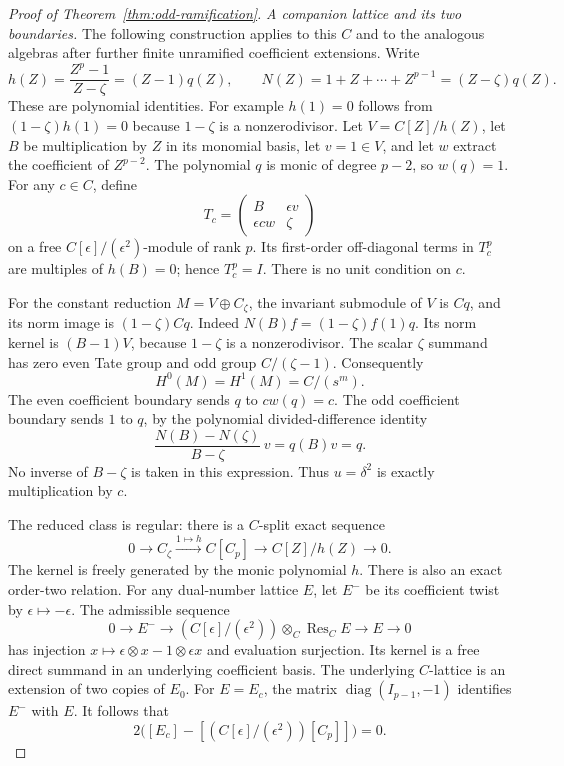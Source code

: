 \begin{proof}[Proof of Theorem~\ref{thm:odd-ramification}]
\emph{A companion lattice and its two boundaries.}
The following construction applies to this $C$ and to the analogous
algebras after further finite unramified coefficient extensions.
Write
\[
 h(Z)=\frac{Z^p-1}{Z-\zeta}=(Z-1)q(Z),\qquad
 N(Z)=1+Z+\cdots+Z^{p-1}=(Z-\zeta)q(Z).
\]
These are polynomial identities.  For example $h(1)=0$ follows from
$(1-\zeta)h(1)=0$ because $1-\zeta$ is a nonzerodivisor.
Let $V=C[Z]/h(Z)$, let $B$ be multiplication by $Z$ in its monomial
basis, let $v=1\in V$, and let $w$ extract the coefficient of
$Z^{p-2}$.  The polynomial $q$ is monic of degree $p-2$, so $w(q)=1$.
For any $c\in C$, define
\[
 T_c=\begin{pmatrix}B&\epsilon v\\\epsilon c w&\zeta\end{pmatrix}
\]
on a free $C[\epsilon]/(\epsilon^2)$-module of rank $p$.
Its first-order off-diagonal terms in $T_c^p$ are multiples of
$h(B)=0$; hence $T_c^p=I$.
There is no unit condition on $c$.

For the constant reduction $M=V\oplus C_\zeta$, the invariant
submodule of $V$ is $Cq$, and its norm image is $(1-\zeta)Cq$.
Indeed $N(B)f=(1-\zeta)f(1)q$.
Its norm kernel is $(B-1)V$, because $1-\zeta$ is a nonzerodivisor.
The scalar $\zeta$ summand has zero even Tate group and odd group
$C/(\zeta-1)$.  Consequently
\[
 H^0(M)=H^1(M)=C/(s^m).
\]
The even coefficient boundary sends $q$ to $cw(q)=c$.
The odd coefficient boundary sends $1$ to $q$, by the polynomial
divided-difference identity
\[
 \frac{N(B)-N(\zeta)}{B-\zeta}\,v=q(B)v=q.
\]
No inverse of $B-\zeta$ is taken in this expression.
Thus $u=\delta^2$ is exactly multiplication by $c$.

The reduced class is regular: there is a $C$-split exact sequence
\[
 0\longrightarrow C_\zeta\xrightarrow{1\mapsto h}
 C[C_p]\longrightarrow C[Z]/h(Z)\longrightarrow0.
\]
The kernel is freely generated by the monic polynomial $h$.
There is also an exact order-two relation.
For any dual-number lattice $E$, let $E^-$ be its coefficient twist
by $\epsilon\mapsto-\epsilon$.
The admissible sequence
\[
 0\longrightarrow E^-\longrightarrow
 (C[\epsilon]/(\epsilon^2))\otimes_C\operatorname{Res}_C E
 \longrightarrow E\longrightarrow0
\]
has injection $x\mapsto\epsilon\otimes x-1\otimes\epsilon x$
and evaluation surjection.  Its kernel is a free direct summand in
an underlying coefficient basis.
The underlying $C$-lattice is an extension of two copies of $E_0$.
For $E=E_c$, the matrix $\operatorname{diag}(I_{p-1},-1)$ identifies
$E^-$ with $E$.  It follows that
\begin{equation}\label{eq:odd-order-two}
 2\bigl([E_c]-[(C[\epsilon]/(\epsilon^2))[C_p]]\bigr)=0.
\end{equation}


\end{proof}
